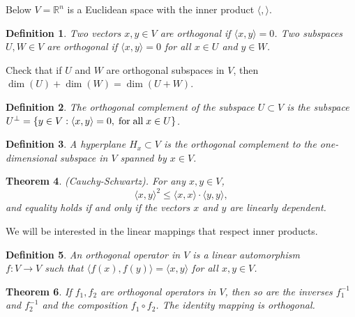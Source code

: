 \documentclass[11pt]{amsart}
\newcommand{\R}{\mathbb R}
\newcommand{\la}{\langle}
\newcommand{\ra}{\rangle}
\newtheorem{theorem}{Theorem}
\newtheorem{definition}[theorem]{Definition}
\newtheorem{corollary}[theorem]{Corollary}
\begin{document}
Below $V = \R^n$ is a Euclidean space with the inner product $\la, \ra$. 

\begin{definition} Two vectors $x, y \in V$ are \emph{orthogonal} if 
$\la x, y \ra =0$. Two subspaces $U,W \in V$ are orthogonal if 
$\la x, y \ra =0$ for all $x \in U$ and $y \in W$. 
\end{definition} 

Check that if $U$ and $W$ are orthogonal subspaces in $V$, then 
$\dim(U) + \dim(W) = \dim (U+W)$. 

\begin{definition} The \emph{orthogonal complement} of the subspace $U \subset V$ 
is the subspace $U^\perp = \{ y \in V : \la x,y \ra =0, \;{\rm for} \; 
{\rm all} \; x \in U\}$.  
\end{definition} 

\begin{definition} A \emph{hyperplane} $H_x \subset V$ is the orthogonal 
complement to the one-dimensional subspace in $V$ spanned by $x \in V$. 
\end{definition} 

\begin{theorem}(Cauchy-Schwartz). For any $x, y \in V$, 
$$ \la x, y \ra^2 \leq \la x, x \ra \cdot \la y, y \ra ,$$ 
and equality holds if and only if the vectors $x$ and $y$ 
are linearly dependent. 
\end{theorem} 


      
We will be interested in the linear mappings that respect inner products. 

\begin{definition} An \emph{orthogonal operator} in $V$ is a linear 
automorphism \\ $f : V \to V $ such that $\la f(x), f(y) \ra = \la x,y \ra$ 
for all $x,y \in V$. 
\end{definition} 

\begin{theorem} \label{O(V)}
If $f_1, f_2$ are orthogonal operators in $V$, then 
so are the inverses $f_1^{-1}$ and 
$f_2^{-1}$ and the composition $f_1 \circ f_2$.
The identity mapping is orthogonal. 
\end{theorem}
\end{document}
